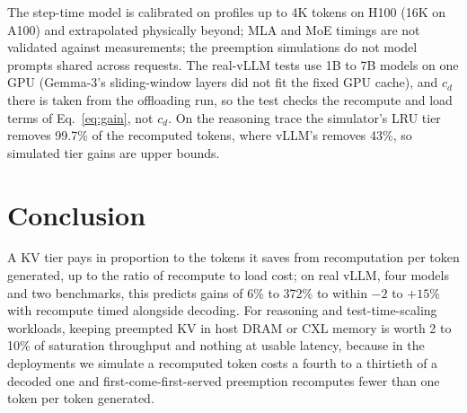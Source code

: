 \documentclass[journal]{IEEEtran}
\begin{document}
The step-time model is calibrated on profiles up to 4K tokens on H100 (16K on A100) and extrapolated
physically beyond; MLA and MoE timings are not validated against measurements; the preemption
simulations do not model prompts shared across requests. The real-vLLM tests use 1B to 7B models on one GPU (Gemma-3's
sliding-window layers did not fit the fixed GPU cache), and $c_d$ there is taken from the offloading run, so the test checks the recompute and load
terms of Eq.~\ref{eq:gain}, not $c_d$. On the reasoning trace the simulator's LRU tier removes 99.7\% of the recomputed tokens, where
vLLM's removes 43\%, so simulated tier gains are upper bounds.

\section{Conclusion}
A KV tier pays in proportion to the tokens it saves from recomputation per token generated, up to the
ratio of recompute to load cost; on real vLLM, four models and two benchmarks, this predicts gains of 6\%
to 372\% to within $-2$ to $+15\%$ with recompute timed alongside decoding.
For reasoning and test-time-scaling workloads, keeping preempted KV in host DRAM or CXL memory is
worth 2 to 10\% of saturation throughput and nothing at usable latency, because in the deployments
we simulate a recomputed token costs a fourth to a thirtieth of a decoded one and first-come-first-served preemption recomputes
fewer than one token per token generated.



\end{document}
